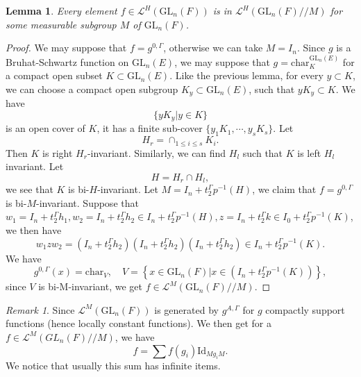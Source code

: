 \documentclass{amsart}
\newtheorem{lemma}[theorem]{Lemma}
\theoremstyle{definition}
\theoremstyle{remark}
\newtheorem{remark}[theorem]{Remark}
\numberwithin{equation}{section}
\def  \Char     {\mathrm{char}}
\def  \GL        {\mathrm{GL}}
\def  \Id       {\mathrm{Id}}
\def  \cl       {\mathcal{L}}
\begin{document}
\begin{lemma}
	Every element $f \in \cl^{H}(\GL_n(F))$ is in $\cl^{H}(\GL_n(F)//M)$ for some measurable subgroup  $M$ of $\GL_n(F)$. 
\end{lemma}
\begin{proof}
	We may suppose that $f= g^{0, \Gamma}$,  otherwise we can take $M=I_n$. Since $g$ is a Bruhat-Schwartz function on $\GL_n(E)$, we may suppose that $g= \Char^{\GL_n(E)}_K$ for a compact  open subset $K \subset \GL_n(E)$. Like the previous lemma,  for every $y \subset K$, we can choose a compact open subgroup $K_y \subset \GL_n(E)$, such that $yK_y \subset K$. We have $$
	\{ yK_y| y \in K\}
	$$ 
	is an open cover of $K $, it has a finite  sub-cover $\{y_1K_1, \cdots, y_s K_s \}$. Let
	$$
	H_r=  \cap_{1 \leq i \leq s} K_i.
	$$
	Then $K$ is right $H_r$-invariant. Similarly, we can find $H_l$ such that $K$ is left $H_l$ invariant. Let 
	$$
	H= H_r \cap H_l,
	$$
	we see that $K$ is bi-$H$-invariant.  Let $M=I_n+t_2^{\Gamma}p^{-1}(H)$, we claim that $f= g^{0, \Gamma}$ is bi-$M$-invariant. Suppose that $w_1= I_n+ t_2^{\Gamma}h_1, w_2=I_n+t_2^{\Gamma}h_2 \in I_n+ t_2^{\Gamma} p^{-1}(H), z=I_n+t_2^{\Gamma}k  \in I_0 +t_2^{\Gamma}p^{-1}(K)$, we then have
	$$
	w_1 z w_2=  (I_n+t_2^{\Gamma}h_2)(I_n+t_2^{\Gamma}h_2 )(I_n+t_2^{\Gamma}h_2)   \in I_n+   t_2^{ \Gamma} p^{-1} (K).
	$$
 We have
	$$
	g^{0, \Gamma} (x) = \Char_V,   \quad   V=\left\{x \in \GL_n(F) | x  \in  (I_n+ t_2^{\Gamma} p^{-1}(K))  \right \},
	$$
since $V$ is bi-M-invariant, we get $f \in \cl^M(\GL_n(F)//M)$.
\end{proof}

\begin{remark}
	Since $\cl^M(\GL_n(F))$ is generated by $ g^{A, \Gamma}$   for  $g$  compactly support functions  (hence locally constant functions). We then get for  a $f \in \cl^M(GL_n(F)//M)$, we have
	$$
	f  =\sum  f(g_i) \Id_{Mg_iM}.
	$$
	We notice that usually this sum has infinite items.
\end{remark}







\end{document}
